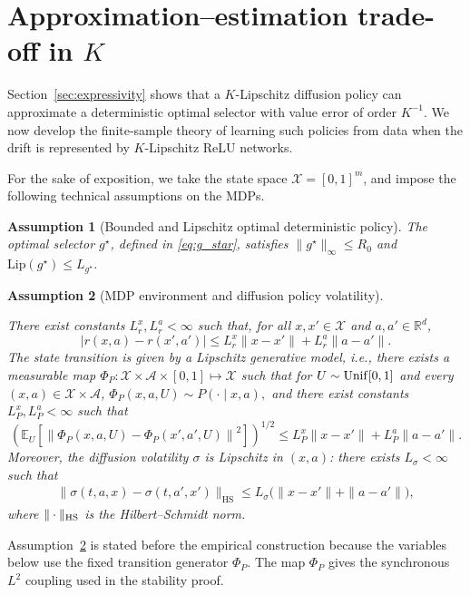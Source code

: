 \documentclass{article}
\newtheorem{asmp}{Assumption}[section]
\newcommand{\1}{\mathbbm{1}}
\numberwithin{equation}{section}
\def\cA{\mathcal{A}}
\begin{document}
\section{Approximation--estimation trade-off in \(K\)}
\label{sec:statistical-estimation}

Section~\ref{sec:expressivity} shows that a \(K\)-Lipschitz diffusion policy can approximate a deterministic optimal selector with value error of order \(K^{-1}\). We now develop the finite-sample theory of learning such policies from data when
the drift is represented by $K$-Lipschitz ReLU networks.


For the sake of exposition,  we take the state space $\mathcal X=[0,1]^m$, and impose the following technical assumptions on the 
MDPs. 

\begin{asmp}[Bounded and Lipschitz optimal deterministic policy]\label{ass:lipschitsz_g}
 The optimal selector $g^\star$, defined in \eqref{eq:g_star}, satisfies $\|g^\star\|_\infty\le R_0$ and $\mathrm{Lip}(g^\star)\le L_{g^\star}$.
\end{asmp}

\begin{asmp}[MDP environment and diffusion policy volatility]
\label{ass:lipschitsz}
 
There exist constants $L_r^x,L_r^a<\infty$ such that, for all $x,x'\in\mathcal X$ and $a,a'\in\mathbb R^d$,
\[
|r(x,a)-r(x',a')|
\le L_r^x\|x-x'\|+L_r^a\|a-a'\|.
\]
 The   state transition is given by  a Lipschitz generative model, i.e.,  
there exists a measurable map $\Phi_P:\mathcal X\times \cA\times[0,1]\mapsto\mathcal X$ such that  for $U\sim{\rm Unif}[0,1]$ and every $(x,a)\in \mathcal X \times \cA$,
\(
\Phi_P(x,a,U)\sim P(\cdot\mid x,a),
\)
and there exist constants $L_P^x,L_P^a<\infty$ such that
\begin{equation}
\label{eq:transition-sampler-l2-section4}
\left(
\mathbb E_U
\left[
\left\|
\Phi_P(x,a,U)-\Phi_P(x',a',U)
\right\|^2
\right]
\right)^{1/2}
\le
L_P^x\|x-x'\|
+
L_P^a\|a-a'\|.
\end{equation}
Moreover, the diffusion volatility $\sigma$ is Lipschitz in $(x,a)$: there exists $L_\sigma<\infty$ such that
\begin{align}\label{sigmalipschitz}
\|\sigma(t,a,x)-\sigma(t,a',x')\|_{\mathrm{HS}}
\le L_\sigma\big(\|x-x'\|+\|a-a'\|\big),
\end{align}
where $\|\cdot\|_{\rm HS}$ is the Hilbert--Schmidt norm.
\end{asmp}
Assumption~\ref{ass:lipschitsz} is stated before the empirical construction because the variables below use the fixed transition generator \(\Phi_P\). The map \(\Phi_P\) gives the synchronous $L^2$ coupling used in the stability proof.
\end{document}
